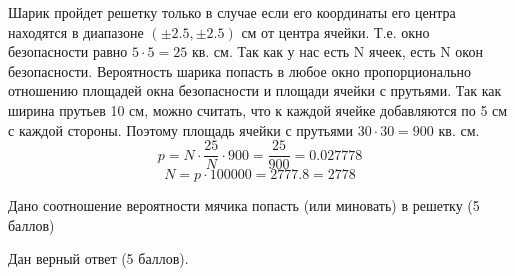 \solutionSection

Шарик пройдет решетку только в случае если его координаты его центра находятся в диапазоне $(\pm2.5, \pm2.5)$ см от центра ячейки. Т.е. окно безопасности равно $5\cdot5=25$ кв. см. Так как у нас есть N ячеек, есть N окон безопасности. Вероятность шарика попасть в любое окно пропорционально отношению площадей окна безопасности и площади ячейки с прутьями. Так как ширина прутьев 10 см, можно считать, что к каждой ячейке добавляются по 5 см с каждой стороны. Поэтому площадь ячейки с прутьями $30\cdot30 = 900$ кв. см.\\
$$p = N\cdot\frac{25}{N}\cdot900 = \frac{25}{900} = 0.027778$$
$$N = p\cdot100000 = 2777.8 = 2778$$

\markSection

Дано соотношение вероятности мячика попасть (или миновать) в решетку (5 баллов) 

Дан верный ответ (5 баллов).

